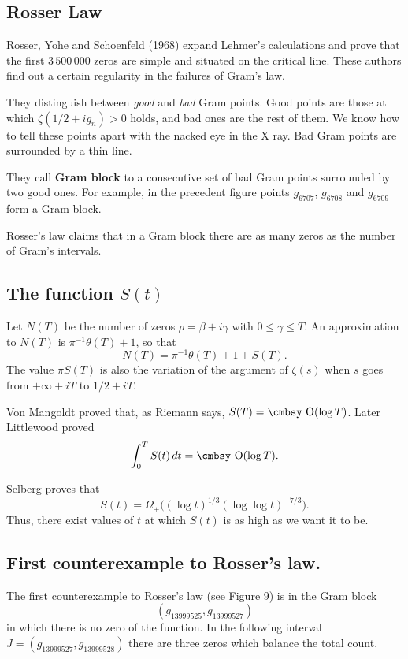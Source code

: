 \documentclass[a4paper]{amsart}
\numberwithin{equation}{section}
\def\Orden{\mathop{\hbox{\cmbsy O}}\nolimits}   %
\begin{document}
\begin{large}



\section{Rosser Law}

Rosser, Yohe and Schoenfeld (1968) expand Lehmer's calculations and prove that
the first $3\,500\,000$ zeros are simple and situated on the critical line. These
authors find out a certain regularity in the failures of Gram's law.

They distinguish between {\sl good} and {\sl bad} Gram points. Good points are
those at which $\zeta(1/2 + ig_n)>0$ holds, and bad ones are the rest of them.
We know how to tell these points apart with the nacked eye in the X 
ray.
Bad Gram points are surrounded by a thin line.

They call {\bf Gram block} to a consecutive set of bad Gram points surrounded
by two good ones. For example, in the precedent figure points $g_{6707}$,
$g_{6708}$ and $g_{6709}$ form a Gram block.


Rosser's law claims that in a Gram block there are as many zeros as the number
of Gram's intervals.

\subsection{The function $S(t)$}
Let $N(T)$ be the number of zeros
$\rho = \beta + i\gamma$ with $0\leq \gamma \leq T$. An
approximation to $N(T)$ is $\pi^{-1}\theta(T) + 1$, so that
$$N(T)=\pi^{-1}\theta(T)+1+S(T).$$
The value  $\pi S(T)$  is also the variation of the argument of $\zeta(s)$
when $s$ goes from $+\infty+iT$ to $1/2+i T$. 

Von Mangoldt proved  that,  as Riemann says, $S(T)=\Orden(\log T)$. 
Later Littlewood proved 
$$\int_0^TS(t)\,dt=\Orden(\log T).$$

Selberg proves that $$S(t)=\Omega_\pm\bigl((\log t)^{1/3}(\log\log t)^{-7/3}\bigr).$$
Thus, there exist values of $t$ at which $S(t)$ is as high as we want it to be.





\subsection{First counterexample to Rosser's law.}
The first counterexample to
Rosser's law (see Figure $9$) is in the Gram block
$$(g_{13999525}, g_{13999527})$$  
in which there is no zero of the function. In the following interval
$J=(g_{13999527}, g_{13999528})$ there are three zeros which balance the total
count.


\end{large}
\end{document}
